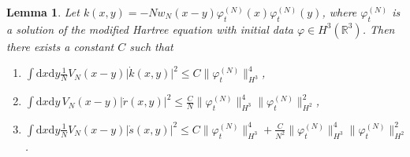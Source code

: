 \documentclass[11pt,a4paper,draft,DIV11]{scrartcl}	%
\newtheorem{lem}[thm]{Lemma}
\newcommand{\di}{\textrm{d}}		%
\newcommand{\Rbb}{\mathbb{R}}		%
\newcommand{\norm}[1]{\lVert#1\rVert}	%
\newcommand{\ph}{\varphi_t^{(N)}}	%
\begin{document}
\begin{lem}
\label{lem:dottedests2}
Let $k(x,y) = -N w_N(x-y) \ph(x) \ph(y)$, where $\ph$ is a solution of the modified Hartree equation with initial data $\varphi \in H^3(\Rbb^3)$. Then there exists a constant $C$ such that
\begin{enumerate}
 \item $\int \di x \di y \frac{1}{N} V_N(x-y) \lvert \dot k(x,y)\rvert^2 \leq C \norm{\ph}_{H^3}^4$, 
 \item $\int \di x\di y\, V_N(x-y) \lvert \dot r(x,y)\rvert^2 \leq \frac{C}{N} \norm{\ph}_{H^3}^4 \norm{\ph}_{H^2}^2$,
 \item $\int \di x\di y\frac{1}{N} V_N(x-y) \lvert \dot s(x,y)\rvert^2 \leq C \norm{\ph}_{H^3}^4 + \frac{C}{N^2} \norm{\ph}_{H^3}^4 \norm{\ph}_{H^2}^2$.
\end{enumerate}
\end{lem}
\end{document}

